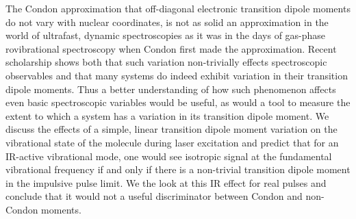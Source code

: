 The Condon approximation that off-diagonal electronic transition dipole moments do not vary with nuclear coordinates, is not as solid an approximation in the world of ultrafast, dynamic spectroscopies as it was in the days of gas-phase rovibrational spectroscopy when Condon first made the approximation.  Recent scholarship shows both that such variation non-trivially effects spectroscopic observables and that many systems do indeed exhibit variation in their transition dipole moments.  Thus a better understanding of how such phenomenon affects even basic spectroscopic variables would be useful, as would a tool to measure the extent to which a system has a variation in its transition dipole moment.  We discuss the effects of a simple, linear transition dipole moment variation on the vibrational state of the molecule during laser excitation and predict that for an IR-active vibrational mode, one would see isotropic signal at the fundamental vibrational frequency if and only if there is a non-trivial transition dipole moment in the impulsive pulse limit.  We the look at this IR effect for real pulses and conclude that it would not a useful discriminator between Condon and non-Condon moments.
